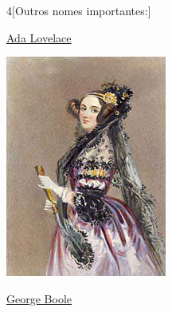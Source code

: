 \begin{multicols}{4}[Outros nomes importantes:]
\vfill\null
\columnbreak

\href{https://pt.wikipedia.org/wiki/Ada_Lovelace}{Ada Lovelace}

\begin{center}
	\includegraphics[width=.8\columnwidth]{./IMG-GIT/CIENTISTAS/200px-Ada_lovelace.jpg}
\end{center}

\vfill\null
\columnbreak

\href{https://pt.wikipedia.org/wiki/George_Boole}{George Boole}


\end{multicols}
